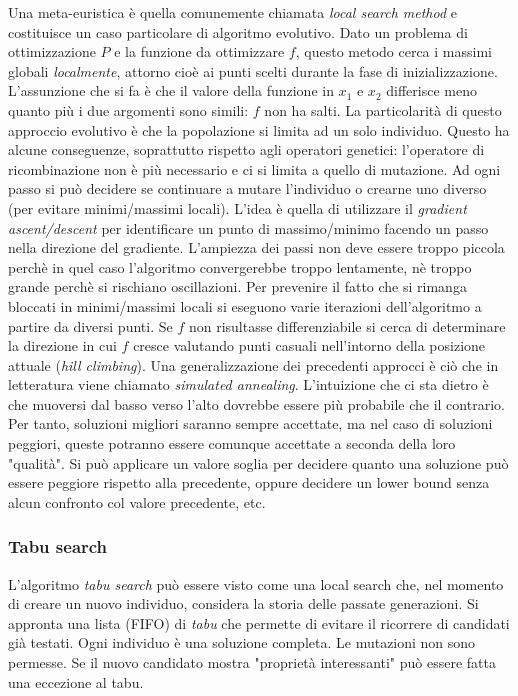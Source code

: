 \documentclass[10pt,a4paper]{article}
\begin{document}
Una meta-euristica è quella comunemente chiamata \emph{local search method} e costituisce un caso particolare di algoritmo evolutivo. Dato un problema di ottimizzazione $P$ e la funzione da ottimizzare $f$, questo metodo cerca i massimi globali \emph{localmente}, attorno cioè ai punti scelti durante la fase di inizializzazione. L'assunzione che si fa è che il valore della funzione in $x_1$ e $x_2$ differisce meno quanto più i due argomenti sono simili: $f$ non ha salti. 
La particolarità di questo approccio evolutivo è che la popolazione si limita ad un solo individuo. Questo ha alcune conseguenze, soprattutto rispetto agli operatori genetici: l'operatore di ricombinazione non è più necessario e ci si limita a quello di mutazione. Ad ogni passo si può decidere se continuare a mutare l'individuo o crearne uno diverso (per evitare minimi/massimi locali). L'idea è quella di utilizzare il \emph{gradient ascent/descent} per identificare un punto di massimo/minimo facendo un passo nella direzione del gradiente. L'ampiezza dei passi non deve essere troppo piccola perchè in quel caso l'algoritmo convergerebbe troppo lentamente, nè troppo grande perchè si rischiano oscillazioni. Per prevenire il fatto che si rimanga bloccati in minimi/massimi locali si eseguono varie iterazioni dell'algoritmo a partire da diversi punti. Se $f$ non risultasse differenziabile si cerca di determinare la direzione in cui $f$ cresce valutando punti casuali nell'intorno della posizione attuale (\emph{hill climbing}). Una generalizzazione dei precedenti approcci è ciò che in letteratura viene chiamato \emph{simulated annealing}. L'intuizione che ci sta dietro è che muoversi dal basso verso l'alto dovrebbe essere più probabile che il contrario. Per tanto, soluzioni migliori saranno sempre accettate, ma nel caso di soluzioni peggiori, queste potranno essere comunque accettate a seconda della loro "qualità". Si può applicare un valore soglia per decidere quanto una soluzione può essere peggiore rispetto alla precedente, oppure decidere un lower bound senza alcun confronto col valore precedente, etc.

\subsubsection{Tabu search}

L'algoritmo \emph{tabu search} può essere visto come una local search che, nel momento di creare un nuovo individuo, considera la storia delle passate generazioni. Si appronta una lista (FIFO) di \emph{tabu} che permette di evitare il ricorrere di candidati già testati. Ogni individuo è una soluzione completa. Le mutazioni non sono permesse. Se il nuovo candidato mostra "proprietà interessanti" può essere fatta una eccezione al tabu.
\end{document}
